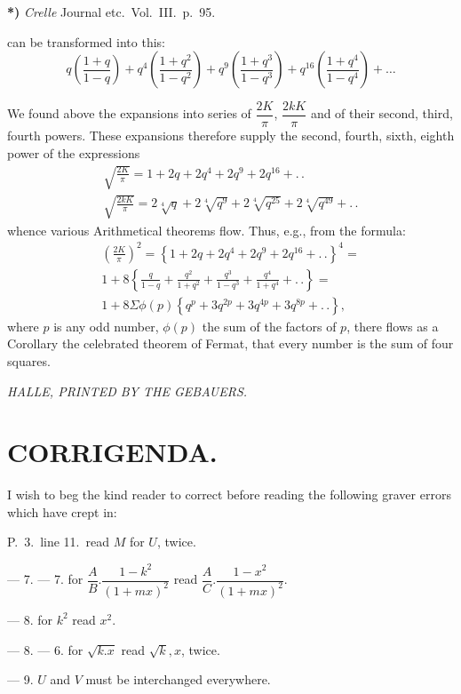\documentclass{article}
\begin{document}
\textbf{*)} \emph{Crelle} Journal etc.\ Vol.\ III.\ p.\ 95.

can be transformed into this:
\[
q\left(\frac{1+q}{1-q}\right)+q^{4}\left(\frac{1+q^{2}}{1-q^{2}}\right)+q^{9}\left(\frac{1+q^{3}}{1-q^{3}}\right)+q^{16}\left(\frac{1+q^{4}}{1-q^{4}}\right)+\ldots
\]

We found above the expansions into series of $\dfrac{2K}{\pi}$, $\dfrac{2kK}{\pi}$ and of their second, third, fourth powers. These expansions therefore supply the second, fourth, sixth, eighth power of the expressions
\[
\begin{gathered}
\sqrt{\frac{2K}{\pi}}=1+2q+2q^{4}+2q^{9}+2q^{16}+.\,.\\[2ex]
\sqrt{\frac{2kK}{\pi}}=2\sqrt[4]{q}+2\sqrt[4]{q^{9}}+2\sqrt[4]{q^{25}}+2\sqrt[4]{q^{49}}+.\,.
\end{gathered}
\]
whence various Arithmetical theorems flow. Thus, e.g., from the formula:
\[
\begin{gathered}
\left(\frac{2K}{\pi}\right)^{2}=\left\{1+2q+2q^{4}+2q^{9}+2q^{16}+.\,.\right\}^{4}=\\[1.5ex]
1+8\left\{\frac{q}{1-q}+\frac{q^{2}}{1+q^{2}}+\frac{q^{3}}{1-q^{3}}+\frac{q^{4}}{1+q^{4}}+.\,.\right\}=\\[1.5ex]
1+8\Sigma\phi(p)\left\{q^{p}+3q^{2p}+3q^{4p}+3q^{8p}+.\,.\right\},
\end{gathered}
\]
where $p$ is any odd number, $\phi(p)$ the sum of the factors of $p$, there flows as a Corollary the celebrated theorem of Fermat, that every number is the sum of four squares.

\emph{HALLE, PRINTED BY THE GEBAUERS.}


\section*{CORRIGENDA.}

I wish to beg the kind reader to correct before reading the following graver errors which have crept in:

P.\ 3.\ line 11.\ read $M$ for $U$, twice.

--- 7. --- 7. for $\dfrac{A}{B}.\dfrac{1-k^{2}}{(1+mx)^{2}}$ read $\dfrac{A}{C}.\dfrac{1-x^{2}}{(1+mx)^{2}}$.

--- 8. for $k^{2}$ read $x^{2}$.

--- 8. --- 6. for $\sqrt{k.x}$ read $\sqrt{k},x$, twice.

--- 9. $U$ and $V$ must be interchanged everywhere.
\end{document}
